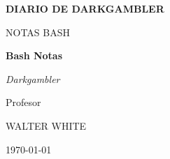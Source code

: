 \begin{titlepage}
	\centering
	
	{\scshape\LARGE \textbf{DIARIO DE DARKGAMBLER} \par}
	\vspace{1cm}
	{\scshape\Large NOTAS BASH\par}
	\vspace{1.5cm}
	{\huge\bfseries \textcolor{azulSection}{Bash Notas}\par}
	\vspace{2cm}
	       {\Large\itshape Darkgambler\par}
	\vfill
	Profesor\par
	WALTER WHITE

	\vfill

	{\large \today\par}
\end{titlepage}
